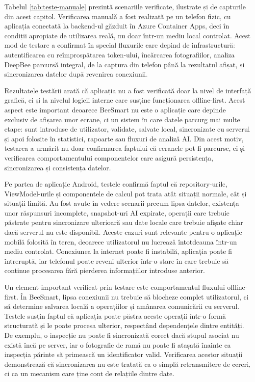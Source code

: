 Tabelul \ref{tab:teste-manuale} prezintă scenariile verificate, ilustrate și de capturile din acest capitol. Verificarea manuală a fost realizată pe un telefon fizic, cu aplicația conectată la backend-ul găzduit în Azure Container Apps, deci în condiții apropiate de utilizarea reală, nu doar într-un mediu local controlat. Acest mod de testare a confirmat în special fluxurile care depind de infrastructură: autentificarea cu reîmprospătarea token-ului, încărcarea fotografiilor, analiza DeepBee parcursă integral, de la captura din telefon până la rezultatul afișat, și sincronizarea datelor după revenirea conexiunii.

Rezultatele testării arată că aplicația nu a fost verificată doar la nivel de interfață grafică, ci și la nivelul logicii interne care susține funcționarea offline-first. Acest aspect este important deoarece BeeSmart nu este o aplicație care depinde exclusiv de afișarea unor ecrane, ci un sistem în care datele parcurg mai multe etape: sunt introduse de utilizator, validate, salvate local, sincronizate cu serverul și apoi folosite în statistici, rapoarte sau fluxuri de analiză AI. Din acest motiv, testarea a urmărit nu doar confirmarea faptului că ecranele pot fi parcurse, ci și verificarea comportamentului componentelor care asigură persistența, sincronizarea și consistența datelor.

Pe partea de aplicație Android, testele confirmă faptul că repository-urile, ViewModel-urile și componentele de calcul pot trata atât situații normale, cât și situații limită. Au fost avute în vedere scenarii precum lipsa datelor, existența unor răspunsuri incomplete, snapshot-uri AI expirate, operații care trebuie păstrate pentru sincronizare ulterioară sau date locale care trebuie afișate chiar dacă serverul nu este disponibil. Aceste cazuri sunt relevante pentru o aplicație mobilă folosită în teren, deoarece utilizatorul nu lucrează întotdeauna într-un mediu controlat. Conexiunea la internet poate fi instabilă, aplicația poate fi întreruptă, iar telefonul poate reveni ulterior într-o stare în care trebuie să continue procesarea fără pierderea informațiilor introduse anterior.

Un element important verificat prin testare este comportamentul fluxului offline-first. În BeeSmart, lipsa conexiunii nu trebuie să blocheze complet utilizatorul, ci să determine salvarea locală a operațiilor și amânarea comunicării cu serverul. Testele susțin faptul că aplicația poate păstra aceste operații într-o formă structurată și le poate procesa ulterior, respectând dependențele dintre entități. De exemplu, o inspecție nu poate fi sincronizată corect dacă stupul asociat nu există încă pe server, iar o fotografie de ramă nu poate fi atașată înainte ca inspecția părinte să primească un identificator valid. Verificarea acestor situații demonstrează că sincronizarea nu este tratată ca o simplă retransmitere de cereri, ci ca un mecanism care ține cont de relațiile dintre date.

